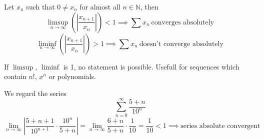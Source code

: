 \begin{proposition}\label{pro:ratio_test}
   Let \(x_n\) such that \(0 \neq x_n\) for almost all \(n \in \mathbb{N}\), then
   \[\limsup_{n \to \infty} \left(\left|\frac{x_{n+1}}{x_n}\right|\right) < 1 \implies \sum x_n~\text{converges absolutely}\]
   \[\liminf_{n \to \infty} \left(\left|\frac{x_{n+1}}{x_n}\right|\right) > 1 \implies \sum x_n~\text{doesn't converge absolutely}\]
\end{proposition}
\begin{remark}
   If \(\limsup\), \(\liminf\) is 1, no statement is possible.
   Usefull for sequences which contain \(n!\), \(x^n\) or polynomials.
\end{remark}
\begin{example}
   We regard the series
   \[\sum_{n=0}^\infty \frac{5 + n}{10^n}\]
   \[\lim_{n \to \infty} \left|\frac{5 + n + 1}{10^{n+1}} \cdot \frac{10^n}{5 + n}\right| = \lim_{n \to \infty} \frac{6+n}{5+n} \cdot \frac{1}{10} = \frac{1}{10} < 1 \implies \text{series absolute convergent}\]
\end{example}

